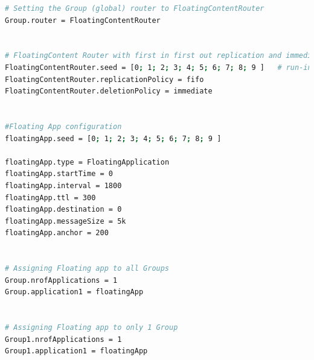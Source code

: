 \begin{lstlisting}[language=bash]
# Setting the Group (global) router to FloatingContentRouter
Group.router = FloatingContentRouter


# FloatingContent Router with first in first out replication and immediate deletion
FloatingContentRouter.seed = [0; 1; 2; 3; 4; 5; 6; 7; 8; 9 ]   # run-indexed seed for random number generator
FloatingContentRouter.replicationPolicy = fifo
FloatingContentRouter.deletionPolicy = immediate


#Floating App configuration
floatingApp.seed = [0; 1; 2; 3; 4; 5; 6; 7; 8; 9 ]

floatingApp.type = FloatingApplication
floatingApp.startTime = 0
floatingApp.interval = 1800
floatingApp.ttl = 300
floatingApp.destination = 0
floatingApp.messageSize = 5k
floatingApp.anchor = 200


# Assigning Floating app to all Groups
Group.nrofApplications = 1
Group.application1 = floatingApp


# Assigning Floating app to only 1 Group
Group1.nrofApplications = 1
Group1.application1 = floatingApp

\end{lstlisting}
